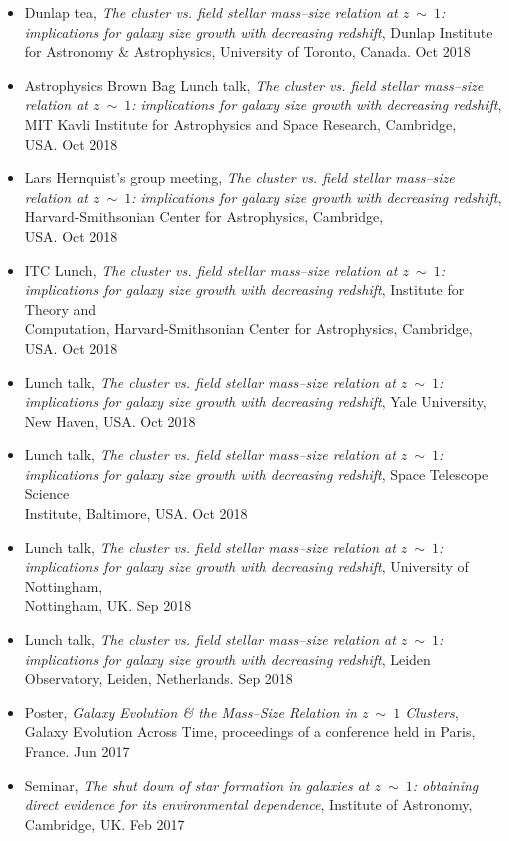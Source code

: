 \documentclass[11pt]{article}
\newenvironment{innerlist}[1][\enskip\textbullet]%
        {\begin{itemize}[#1,leftmargin=*,parsep=0pt,itemsep=0pt,topsep=0pt,partopsep=0pt]}
        {\end{itemize}}
\begin{document}
\begin{innerlist}
\item Dunlap tea, {\it The cluster vs. field stellar mass--size relation at $z~\mathtt{\sim}~1$: implications for galaxy size growth with decreasing redshift}, Dunlap Institute for Astronomy \& Astrophysics, University of Toronto, Canada. \hfill Oct 2018
\item Astrophysics Brown Bag Lunch talk,  {\it The cluster vs. field stellar mass--size relation at $z~\mathtt{\sim}~1$: implications for galaxy size growth with decreasing redshift}, MIT Kavli Institute for Astrophysics and Space Research, Cambridge, \\USA. \hfill Oct 2018
\item Lars Hernquist's group meeting, {\it The cluster vs. field stellar mass--size relation at $z~\mathtt{\sim}~1$: implications for galaxy size growth with decreasing redshift}, Harvard-Smithsonian Center for Astrophysics, Cambridge, \\USA. \hfill Oct 2018
\item ITC Lunch, {\it The cluster vs. field stellar mass--size relation at $z~\mathtt{\sim}~1$: implications for galaxy size growth with decreasing redshift}, Institute for Theory and\\ Computation, Harvard-Smithsonian Center for Astrophysics, Cambridge,\\ USA. \hfill Oct 2018
\item Lunch talk, {\it The cluster vs. field stellar mass--size relation at $z~\mathtt{\sim}~1$: implications for galaxy size growth with decreasing redshift}, Yale University, New Haven, USA.  \hfill Oct 2018
\item Lunch talk, {\it The cluster vs. field stellar mass--size relation at $z~\mathtt{\sim}~1$: implications for galaxy size growth with decreasing redshift}, Space Telescope Science \\Institute, Baltimore, USA. \hfill Oct 2018
\item Lunch talk, {\it The cluster vs. field stellar mass--size relation at $z~\mathtt{\sim}~1$: implications for galaxy size growth with decreasing redshift}, University of Nottingham, \\ Nottingham, UK. \hfill Sep 2018
\item Lunch talk, {\it The cluster vs. field stellar mass--size relation at $z~\mathtt{\sim}~1$: implications for galaxy size growth with decreasing redshift}, Leiden Observatory, Leiden, Netherlands. \hfill Sep 2018
\item Poster, {\it Galaxy Evolution \& the Mass--Size Relation in $z~\mathtt{\sim}~1$ Clusters}, Galaxy Evolution Across Time, proceedings of a conference held in Paris, \\France. \hfill Jun 2017
\item Seminar, {\it The shut down of star formation in galaxies at $z~\mathtt{\sim}~1$: obtaining direct evidence for its environmental dependence}, Institute of Astronomy, Cambridge, UK. \hfill Feb 2017

\end{innerlist}
\end{document}
